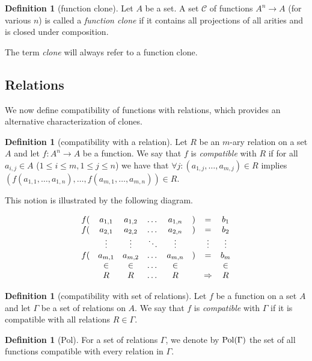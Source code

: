 \documentclass{amsart}
\numberwithin{equation}{section}
\theoremstyle{plain}
\theoremstyle{definition}
\newtheorem{definition}[theorem]{Definition}
\def\set#1{#1}
\def\relation#1{#1}
\def\clone#1{\mathcal{#1}}
\def\Pol{{\rm Pol}}
\begin{document}
\begin{definition}[function clone]
Let $\set{A}$ be a set. A set $\clone{C}$ of functions $\set{A}^n\to \set{A}$ (for various $n$) is called a {\em function clone} if it contains all projections of all arities and is closed under composition.
\end{definition}

The term \emph{clone} will always refer to a function clone.

\subsection{Relations}

We now define compatibility of functions with relations, which provides an alternative characterization of clones.

\begin{definition}[compatibility with a relation]
  Let $\relation{R}$ be an $m$-ary relation on a set $\set{A}$ and let $f\colon \set{A}^n \to \set{A}$ be a function. We say that $f$ is {\em compatible} with $\relation{R}$ if for all $a_{i,j}\in \set{A}$ ($1\leq i\leq m, 1\leq j\leq n$) we have that $\forall j\colon(a_{1,j},\dots,a_{m,j})\in \relation{R}$ implies $(f(a_{1,1},\dots,a_{1,n}),\dots,f(a_{m,1},\dots,a_{m,n}))\in \relation{R}$.
\end{definition}

This notion is illustrated by the following diagram.

$$\begin{matrix}
f(& a_{1,1} & a_{1,2} & \dots & a_{1,n} & ) & = & b_1 \cr
f(& a_{2,1} & a_{2,2} & \dots & a_{2,n} & ) & = & b_2 \cr
& \vdots & \vdots & \ddots & \vdots &  & \vdots & \vdots \cr
f(& a_{m,1} & a_{m,2} & \dots & a_{m,n} & ) & = & b_m \cr
& \in & \in & \dots & \in &  &  & \in \cr
& R & R & \dots & R &  & \Rightarrow & R \cr
\end{matrix}$$


\begin{definition}[compatibility with set of relations]
Let $f$ be a function on a set $\set{A}$ and let $\Gamma$ be a set of relations on $\set{A}$. We say that $f$ is {\it compatible} with $\Gamma$ if it is compatible with all relations $\relation{R}\in\Gamma$.
\end{definition}

\begin{definition}[Pol]
For a set of relations $\Gamma$, we denote by $\Pol(\Gamma)$ the set of all functions compatible with every relation in $\Gamma$.
\end{definition}
\end{document}
